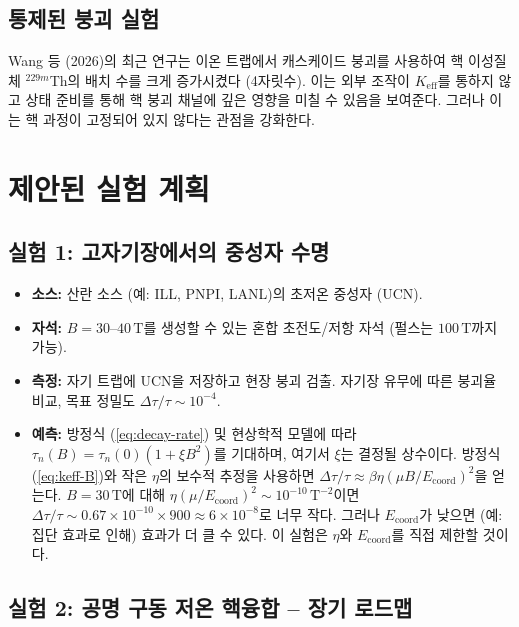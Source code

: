 \documentclass[11pt,a4paper]{article}
\theoremstyle{remark}
\newcommand{\Keff}{K_{\mathrm{eff}}}
\begin{document}
	\subsection{통제된 붕괴 실험}
	
	Wang 등 (2026)의 최근 연구는 이온 트랩에서 캐스케이드 붕괴를 사용하여 핵 이성질체 \(^{229m}\)Th의 배치 수를 크게 증가시켰다 (4자릿수). 이는 외부 조작이 \(\Keff\)를 통하지 않고 상태 준비를 통해 핵 붕괴 채널에 깊은 영향을 미칠 수 있음을 보여준다. 그러나 이는 핵 과정이 고정되어 있지 않다는 관점을 강화한다.
	
	\section{제안된 실험 계획}
	\label{sec:experiments}
	
	\subsection{실험 1: 고자기장에서의 중성자 수명}
	
	\begin{itemize}
		\item \textbf{소스:} 산란 소스 (예: ILL, PNPI, LANL)의 초저온 중성자 (UCN).
		\item \textbf{자석:} \(B = 30\)–\(40\,\text{T}\)를 생성할 수 있는 혼합 초전도/저항 자석 (펄스는 \(100\,\text{T}\)까지 가능).
		\item \textbf{측정:} 자기 트랩에 UCN을 저장하고 현장 붕괴 검출. 자기장 유무에 따른 붕괴율 비교, 목표 정밀도 \(\Delta \tau / \tau \sim 10^{-4}\).
		\item \textbf{예측:} 방정식 (\ref{eq:decay-rate}) 및 현상학적 모델에 따라 \(\tau_n(B) = \tau_n(0) (1 + \xi B^2)\)를 기대하며, 여기서 \(\xi\)는 결정될 상수이다. 방정식 (\ref{eq:keff-B})와 작은 \(\eta\)의 보수적 추정을 사용하면 \(\Delta \tau/\tau \approx \beta \eta (\mu B/E_{\mathrm{coord}})^2\)을 얻는다. \(B = 30\,\text{T}\)에 대해 \(\eta (\mu/E_{\mathrm{coord}})^2 \sim 10^{-10}\,\text{T}^{-2}\)이면 \(\Delta \tau/\tau \sim 0.67 \times 10^{-10} \times 900 \approx 6\times10^{-8}\)로 너무 작다. 그러나 \(E_{\mathrm{coord}}\)가 낮으면 (예: 집단 효과로 인해) 효과가 더 클 수 있다. 이 실험은 \(\eta\)와 \(E_{\mathrm{coord}}\)를 직접 제한할 것이다.
	\end{itemize}
	
	\subsection{실험 2: 공명 구동 저온 핵융합 – 장기 로드맵}
	
\end{document}
